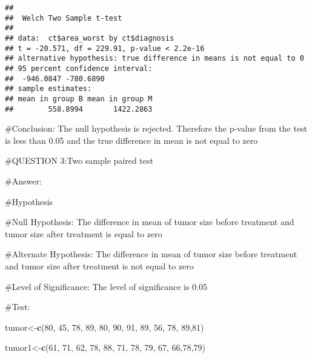 \documentclass[]{article}
\newenvironment{Shaded}{\begin{snugshade}}{\end{snugshade}}
\newcommand{\DecValTok}[1]{\textcolor[rgb]{0.00,0.00,0.81}{#1}}
\newcommand{\KeywordTok}[1]{\textcolor[rgb]{0.13,0.29,0.53}{\textbf{#1}}}
\newcommand{\NormalTok}[1]{#1}
\begin{document}
\begin{verbatim}
## 
##  Welch Two Sample t-test
## 
## data:  ct$area_worst by ct$diagnosis
## t = -20.571, df = 229.91, p-value < 2.2e-16
## alternative hypothesis: true difference in means is not equal to 0
## 95 percent confidence interval:
##  -946.0847 -780.6890
## sample estimates:
## mean in group B mean in group M 
##        558.8994       1422.2863
\end{verbatim}

\#Conclusion: The null hypothesis is rejected. Therefore the p-value
from the test is less than 0.05 and the true difference in mean is not
equal to zero

\#QUESTION 3:Two sample paired test

\#Answer:

\#Hypothesis

\#Null Hypothesis: The difference in mean of tumor size before treatment
and tumor size after treatment is equal to zero

\#Alternate Hypothesis: The difference in mean of tumor size before
treatment and tumor size after treatment is not equal to zero

\#Level of Significance: The level of significance is 0.05

\#Test:

\begin{Shaded}
\begin{Highlighting}[]
\NormalTok{tumor<-}\KeywordTok{c}\NormalTok{(}\DecValTok{80}\NormalTok{, }\DecValTok{45}\NormalTok{, }\DecValTok{78}\NormalTok{, }\DecValTok{89}\NormalTok{, }\DecValTok{80}\NormalTok{, }\DecValTok{90}\NormalTok{, }\DecValTok{91}\NormalTok{, }\DecValTok{89}\NormalTok{, }\DecValTok{56}\NormalTok{, }\DecValTok{78}\NormalTok{, }\DecValTok{89}\NormalTok{,}\DecValTok{81}\NormalTok{)}
\end{Highlighting}
\end{Shaded}

\begin{Shaded}
\begin{Highlighting}[]
\NormalTok{tumor1<-}\KeywordTok{c}\NormalTok{(}\DecValTok{61}\NormalTok{, }\DecValTok{71}\NormalTok{, }\DecValTok{62}\NormalTok{, }\DecValTok{78}\NormalTok{, }\DecValTok{88}\NormalTok{, }\DecValTok{71}\NormalTok{, }\DecValTok{78}\NormalTok{, }\DecValTok{79}\NormalTok{, }\DecValTok{67}\NormalTok{, }\DecValTok{66}\NormalTok{,}\DecValTok{78}\NormalTok{,}\DecValTok{79}\NormalTok{)}
\end{Highlighting}
\end{Shaded}
\end{document}

